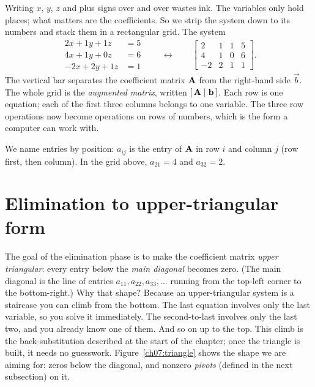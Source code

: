 Writing $x$, $y$, $z$ and plus signs over and over wastes ink. The
variables only hold places; what matters are the coefficients. So we strip the
system down to its numbers and stack them in a rectangular grid. The system
\[
\begin{aligned}
2x + 1y + 1z &= 5\\
4x + 1y + 0z &= 6\\
-2x + 2y + 1z &= 1
\end{aligned}
\qquad\longleftrightarrow\qquad
\left[\begin{array}{ccc|c}
2 & 1 & 1 & 5\\
4 & 1 & 0 & 6\\
-2 & 2 & 1 & 1
\end{array}\right].
\]
The vertical bar separates the coefficient matrix $\mathbf{A}$ from the right-hand
side $\vec{b}$. The whole grid is the \emph{augmented matrix}, written
$[\,\mathbf{A}\mid\mathbf{b}\,]$. Each row is one equation; each of the first three
columns belongs to one variable. The three row operations now become operations
on rows of numbers, which is the form a computer can work with.

We name entries by position: $a_{ij}$ is the entry of $\mathbf{A}$ in row $i$ and
column $j$ (row first, then column). In the grid above, $a_{21}=4$ and
$a_{32}=2$.

\section{Elimination to upper-triangular form}

The goal of the elimination phase is to make the coefficient matrix
\emph{upper triangular}: every entry below the \emph{main diagonal} becomes zero.
(The main diagonal is the line of entries $a_{11}, a_{22}, a_{33}, \dots$ running
from the top-left corner to the bottom-right.) Why
that shape? Because an upper-triangular system is a staircase you can climb from
the bottom. The last equation involves only the last variable, so you solve it
immediately. The second-to-last involves only the last two, and you already know
one of them. And so on up to the top. This climb is the back-substitution
described at the start of the chapter; once the triangle is built, it needs no guesswork.
Figure~\ref{ch07:triangle} shows the shape we are aiming for: zeros below the
diagonal, and nonzero \emph{pivots} (defined in the next subsection) on it.

